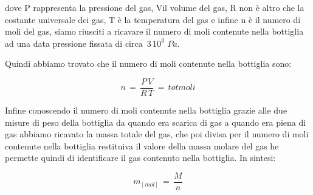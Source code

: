 dove P rappresenta la pressione del gas, Vil volume del gas, R non è altro che la costante universale dei gas, T è la temperatura del gas e infine n è il numero di moli del gas, siamo riusciti a ricavare il numero di moli contenute nella bottiglia ad una data pressione fissata di circa $\,3\,10^3\,\,Pa$.

Quindi abbiamo trovato che il numero di moli contenute nella bottiglia sono:

\begin{equation}
	n \,=\, \frac{P\,V}{R\,T} \,=\, tot moli
\end{equation}

Infine conoscendo il numero di moli contenute nella bottiglia grazie alle due misure di peso della bottiglia da quando era scarica di gas a quando era piena di gas abbiamo ricavato la massa totale del gas, che poi divisa per il numero di moli contenute nella bottiglia restituiva il valore della massa molare del gas he permette quindi di identificare il gas contenuto nella bottiglia. In sintesi:

\begin{equation}
	m_[mol] \,=\, \frac{M}{n}
\end{equation}

